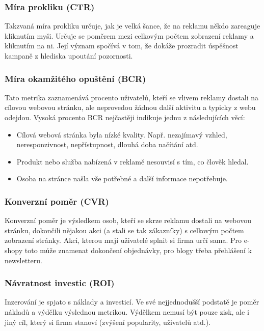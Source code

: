         \subsubsection{Míra prokliku (CTR)}
        Takzvaná míra prokliku určuje, jak je velká šance, že na reklamu někdo zareaguje kliknutím myši. Určuje se poměrem mezi celkovým počtem zobrazení reklamy a
        kliknutím na ni. Její význam spočívá v tom, že dokáže prozradit úspěšnost kampaně z hlediska upoutání pozornosti.

        \subsubsection{Míra okamžitého opuštění (BCR)}
        Tato metrika zaznamenává procento uživatelů, kteří se vlivem reklamy dostali na cílovou webovou stránku, ale neprovedou žádnou další aktivitu a
        typicky z webu odejdou. Vysoká procento BCR nejčastěji indikuje jednu z následujících věcí:
        \begin{itemize}
            \item Cílová webová stránka byla nízké kvality. Např. nezajímavý vzhled, neresponzivnost, nepřístupnost, dlouhá doba načítání atd.
            \item Produkt nebo služba nabízená v reklamě nesouvisí s tím, co člověk hledal.
            \item Osoba na stránce našla vše potřebné a další informace nepotřebuje.
        \end{itemize}

        \subsubsection{Konverzní poměr (CVR)}
        Konverzní poměr je výsledkem osob, kteří se skrze reklamu dostali na webovou stránku, dokončili nějakou akci (a stali se tak zákazníky) s
        celkovým počtem zobrazení stránky. Akci, kterou mají uživatelé splnit si firma určí sama. Pro e-shopy toto může znamenat dokončení objednávky,
        pro blogy třeba přehlášení k newsletteru.

        \subsubsection{Návratnost investic (ROI)}
        Inzerování je spjato s náklady a investicí. Ve své nejjednodušší podstatě je poměr nákladů a výdělku výslednou metrikou.
        Výdělkem nemusí být pouze zisk, ale i jiný cíl, který si firma stanoví (zvýšení popularity, uživatelů atd.).

